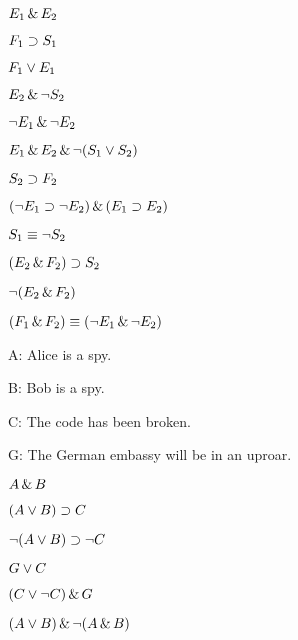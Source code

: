 \begin{earg}
\item $E_1 \,\&\, E_2$
\item $F_1 \supset S_1$
\item $F_1 \vee E_1$
\item $E_2 \,\&\, \neg S_2$
\item $\neg E_1 \,\&\, \neg E_2$
\item $E_1 \,\&\, E_2 \,\&\, \neg(S_1 \vee S_2)$
\item $S_2 \supset F_2$
\item $(\neg E_1 \supset \neg E_2) \,\&\, (E_1 \supset E_2)$
\item $S_1 \equiv \neg S_2$
\item $(E_2 \,\&\, F_2) \supset S_2$
\item $\neg(E_2 \,\&\, F_2)$
\item $(F_1 \,\&\, F_2) \equiv (\neg E_1 \,\&\, \neg E_2)$
\end{earg}

\begin{ekey}
\item[A:] Alice is a spy.
\item[B:] Bob is a spy.
\item[C:] The code has been broken.
\item[G:] The German embassy will be in an uproar.
\end{ekey}
\begin{earg}
\item %
$A \,\&\, B$
\item %
$(A \vee B) \supset C$
\item %
$\neg(A \vee B) \supset \neg C$
\item %
$G \vee C$
\item %
$(C \vee \neg C) \,\&\, G$
\item %
$(A \vee B) \,\&\, \neg(A \,\&\, B)$
\end{earg}

